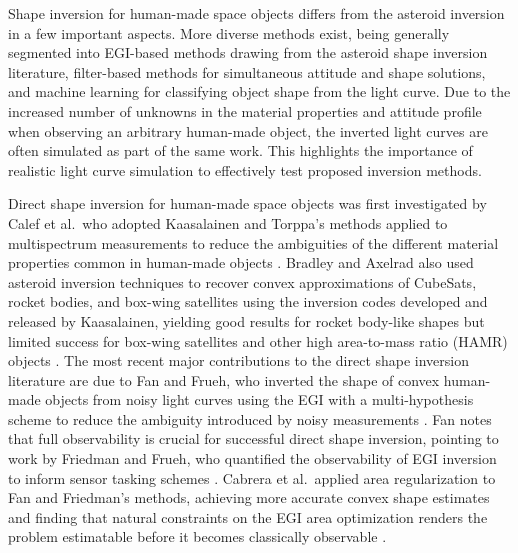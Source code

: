 
Shape inversion for human-made space objects differs from the asteroid inversion in a few important aspects. More diverse methods exist, being generally segmented into EGI-based methods drawing from the asteroid shape inversion literature, filter-based methods for simultaneous attitude and shape solutions, and machine learning for classifying object shape from the light curve. Due to the increased number of unknowns in the material properties and attitude profile when observing an arbitrary human-made object, the inverted light curves are often simulated as part of the same work. This highlights the importance of realistic light curve simulation to effectively test proposed inversion methods. 

Direct shape inversion for human-made space objects was first investigated by Calef et al.\, who adopted Kaasalainen and Torppa's methods applied to multispectrum measurements to reduce the ambiguities of the different material properties common in human-made objects \cite{calef2006photometric}. Bradley and Axelrad also used asteroid inversion techniques to recover convex approximations of CubeSats, rocket bodies, and box-wing satellites using the inversion codes developed and released by Kaasalainen, yielding good results for rocket body-like shapes but limited success for box-wing satellites and other high area-to-mass ratio (HAMR) objects \cite{bradley2014}. The most recent major contributions to the direct shape inversion literature are due to Fan and Frueh, who inverted the shape of convex human-made objects from noisy light curves using the EGI with a multi-hypothesis scheme to reduce the ambiguity introduced by noisy measurements \cite{fan2019, fan2020thesis, fan2021}. Fan notes that full observability is crucial for successful direct shape inversion, pointing to work by Friedman and Frueh, who quantified the observability of EGI inversion to inform sensor tasking schemes \cite{friedman2020, friedman2022}. Cabrera et al.\ applied area regularization to Fan and Friedman's methods, achieving more accurate convex shape estimates and finding that natural constraints on the EGI area optimization renders the problem estimatable before it becomes classically observable \cite{cabrera2021}. 

